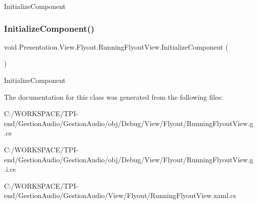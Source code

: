 Initialize\+Component 

\mbox{\label{class_presentation_1_1_view_1_1_flyout_1_1_running_flyout_view_ac284f494bfae1a9a5f8a569710511379}} 
\subsubsection{\texorpdfstring{Initialize\+Component()}{InitializeComponent()}\hspace{0.1cm}{\footnotesize\ttfamily [4/4]}}
{\footnotesize\ttfamily void Presentation.\+View.\+Flyout.\+Running\+Flyout\+View.\+Initialize\+Component (\begin{DoxyParamCaption}{ }\end{DoxyParamCaption})}



Initialize\+Component 



The documentation for this class was generated from the following files\+:\begin{DoxyCompactItemize}
\item 
C\+:/\+W\+O\+R\+K\+S\+P\+A\+C\+E/\+T\+P\+I-\/end/\+Gestion\+Audio/\+Gestion\+Audio/obj/\+Debug/\+View/\+Flyout/Running\+Flyout\+View.\+g.\+cs\item 
C\+:/\+W\+O\+R\+K\+S\+P\+A\+C\+E/\+T\+P\+I-\/end/\+Gestion\+Audio/\+Gestion\+Audio/obj/\+Debug/\+View/\+Flyout/Running\+Flyout\+View.\+g.\+i.\+cs\item 
C\+:/\+W\+O\+R\+K\+S\+P\+A\+C\+E/\+T\+P\+I-\/end/\+Gestion\+Audio/\+Gestion\+Audio/\+View/\+Flyout/Running\+Flyout\+View.\+xaml.\+cs\end{DoxyCompactItemize}
